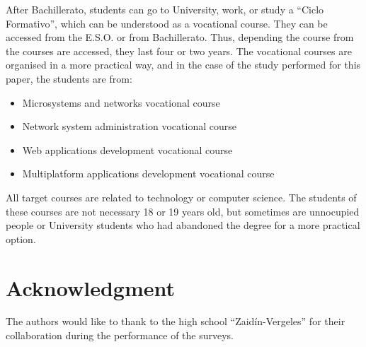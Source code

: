 \documentclass[journal,transmag]{IEEEtran}
\begin{document}
After Bachillerato, students can go to University, work, or study a ``Ciclo Formativo'', which can be understood as a vocational course. They can be accessed from the E.S.O. or from Bachillerato. Thus, depending the course from the courses are accessed, they last four or two years. The vocational courses are organised in a more practical way, and in the case of the study performed for this paper, the students are from:

\begin{itemize}
  \item Microsystems and networks vocational course
  \item Network system administration vocational course
  \item Web applications development vocational course
  \item Multiplatform applications development vocational course
\end{itemize}

All target courses are related to technology or computer science. The students of these courses are not necessary 18 or 19 years old, but sometimes are unnocupied people or University students who had abandoned the degree for a more practical option.

\section*{Acknowledgment}

The authors would like to thank to the high school ``Zaid\'{i}n-Vergeles'' for their collaboration during the performance of the surveys.


\ifCLASSOPTIONcaptionsoff
  \newpage
\fi





%
%
%


\end{document}

